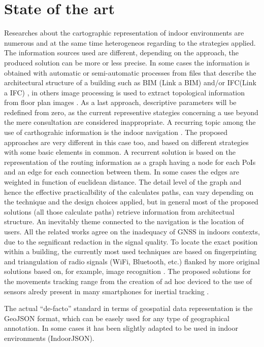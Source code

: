 \documentclass{sig-alternate}
\begin{document}
\section{State of the art}\label{state-of-the-art}

Researches about the cartographic representation of indoor environments
are numerous and at the same time heterogeneos regarding to the
strategies applied. The information sources used are different,
depending on the approach, the produced solution can be more or less
precise. In some cases the information is obtained with automatic or
semi-automatic processes from files that describe the architectural
structure of a building such as BIM (Link a BIM) and/or IFC(Link a IFC)
\cite{6816739}, in others image processing is used to extract topological
information from floor plan images \cite{6878152}. As a last approach,
descriptive parameters will be redefined from zero, as the current
representive stategies concerning a use beyond the mere consultation are
considered inappropriate. A recurring topic among the use of
carthograhic information is the indoor navigation \cite{6878152,6418876,6816739}.
The proposed approaches are very different in this case too,
and based on different strategies with some basic elements in common. A
recurrent solution is based on the representation of the routing
information as a graph having a node for each PoIs and an edge for each
connection between them. In some cases the edges are weighted in
function of euclidean distance. The detail level of the graph and hence
the effective practicalbility of the calculates paths, can vary
depending on the technique and the design choices applied, but in
general most of the proposed solutions (all those calculate paths)
retrieve information from architectual structure. An inevitably theme
connected to the navigation is the location of users. All the related
works agree on the inadequacy of GNSS in indoors contexts, due to the
segnificant redaction in the signal quality. To locate the exact
position within a building, the currently most used techniques are based
on fingerprinting and triangulation of radio signals (WiFi, Bluetooth,
etc.) flanked by more original solutions based on, for example, image
recognition \cite{6815564}. The proposed solutions for the movements tracking
range from the creation of ad hoc deviced \cite{6878152} to the use of
sensors alredy present in many smartphones for inertial tracking \cite{6815564}.

The actual ``de-facto'' standard in terms of geospatial data
representation is the GeoJSON format, which can be easely used for any
type of geographical annotation. In some cases it has been slightly
adapted to be used in indoor environments (IndoorJSON).
\end{document}
